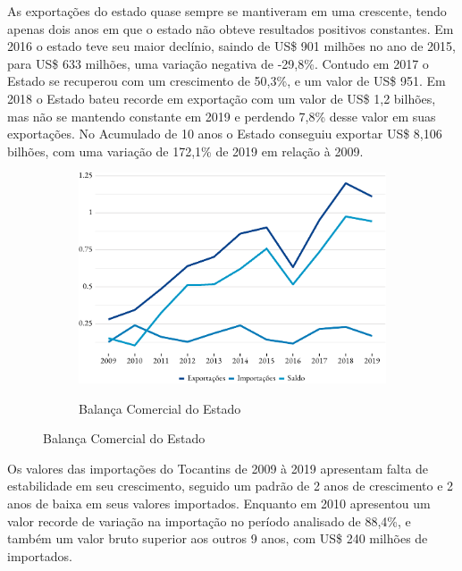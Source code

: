 
\par As exportações do estado quase sempre se mantiveram em uma crescente, tendo apenas dois anos em que o estado não obteve resultados positivos constantes. Em 2016 o estado teve seu maior declínio, saindo de US\$ 901 milhões no ano de 2015, para US\$ 633 milhões, uma variação negativa de -29,8\%. Contudo em 2017 o Estado se recuperou com um crescimento de 50,3\%, e um valor de US\$ 951. Em 2018 o Estado bateu recorde em exportação com um valor de US\$ 1,2 bilhões, mas não se mantendo constante em 2019 e perdendo 7,8\% desse valor em suas exportações. No Acumulado de 10 anos o Estado conseguiu exportar US\$ 8,106 bilhões, com uma variação de 172,1\% de 2019 em relação à 2009.

\begin{figure}[!h]
		\begin{subfigure}{\linewidth}
		\caption{Balança Comercial do Estado}
		\includegraphics{fig/total-1.pdf}
		\label{fig:balanca}
	\end{subfigure}
\end{figure}


\par Os valores das importações do Tocantins de 2009 à 2019 apresentam falta de estabilidade em seu crescimento, seguido um padrão de 2 anos de crescimento e 2 anos de baixa em seus valores importados. Enquanto em 2010 apresentou um valor recorde de variação na importação no período analisado de 88,4\%, e também um valor bruto superior aos outros 9 anos, com US\$ 240 milhões de importados.

